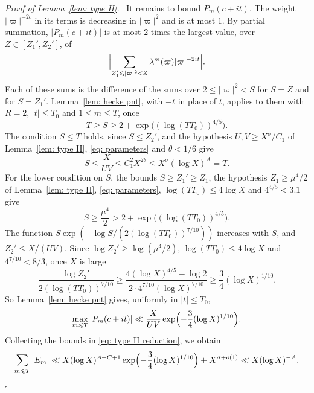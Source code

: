 \documentclass{article}
\numberwithin{equation}{section}
\newenvironment{proof}[1][Proof]{\par\medskip\noindent\textit{#1.}\ }{\hfill$\square$\par\medskip}
\newcommand{\Le}{\leqslant}
\newcommand{\Ge}{\geqslant}
\begin{document}
\begin{proof}[Proof of Lemma~\ref{lem: type II}]
It remains to bound $P_m(c + it)$. The weight $|\varpi|^{-2c}$ in its terms is decreasing in $|\varpi|^2$ and is at most $1$. By partial summation, $|P_m(c + it)|$ is at most $2$ times the largest value, over $Z \in [Z_1', Z_2']$, of
\begin{equation*}
\Bigl| \sum_{Z_1' \Le |\varpi|^2 < Z} \lambda^m(\varpi) |\varpi|^{-2it} \Bigr|.
\end{equation*}
Each of these sums is the difference of the sums over $2 \Le |\varpi|^2 < S$ for $S = Z$ and for $S = Z_1'$. Lemma~\ref{lem: hecke pnt}, with $-t$ in place of $t$, applies to them with $R = 2$, $|t| \Le T_0$ and $1 \Le m \Le T$, once
\begin{equation*}
T \Ge S \Ge 2 + \exp\bigl( (\log(T T_0))^{4/5} \bigr).
\end{equation*}
The condition $S \Le T$ holds, since $S \Le Z_2'$, and the hypothesis $U, V \Ge X^{\sigma}/C_1$ of Lemma~\ref{lem: type II}, \eqref{eq: parameters} and $\theta < 1/6$ give
\begin{equation*}
S \Le \frac{X}{UV} \Le C_1^2 X^{2\theta} \Le X^{\sigma} (\log X)^A = T.
\end{equation*} For the lower condition on $S$, the bounds $S \Ge Z_1' \Ge Z_1$, the hypothesis $Z_1 \Ge \mu^4/2$ of Lemma~\ref{lem: type II}, \eqref{eq: parameters}, $\log(T T_0) \Le 4 \log X$ and $4^{4/5} < 3.1$ give
\begin{equation*}
S \Ge \frac{\mu^4}{2} > 2 + \exp\bigl( (\log(T T_0))^{4/5} \bigr).
\end{equation*}
The function $S \exp(-\log S/(2(\log(T T_0))^{7/10}))$ increases with $S$, and $Z_2' \Le X/(UV)$. Since $\log Z_2' \Ge \log(\mu^4/2)$, $\log(T T_0) \Le 4 \log X$ and $4^{7/10} < 8/3$, once $X$ is large
\begin{equation*}
\frac{\log Z_2'}{2(\log(T T_0))^{7/10}} \Ge \frac{4(\log X)^{4/5} - \log 2}{2 \cdot 4^{7/10} (\log X)^{7/10}} \Ge \frac34 (\log X)^{1/10}.
\end{equation*}
So Lemma~\ref{lem: hecke pnt} gives, uniformly in $|t| \Le T_0$,
\begin{equation*}
\max_{m \Le T} |P_m(c + it)| \ll \frac{X}{UV} \exp\Bigl( -\frac34 (\log X)^{1/10} \Bigr).
\end{equation*}
Collecting the bounds in \eqref{eq: type II reduction}, we obtain
\begin{equation*}
\sum_{m \Le T} |E_m| \ll X (\log X)^{A + C + 1} \exp\Bigl( -\frac34 (\log X)^{1/10} \Bigr) + X^{\sigma + o(1)} \ll X (\log X)^{-A}.
\end{equation*}
\end{proof}
\end{document}

